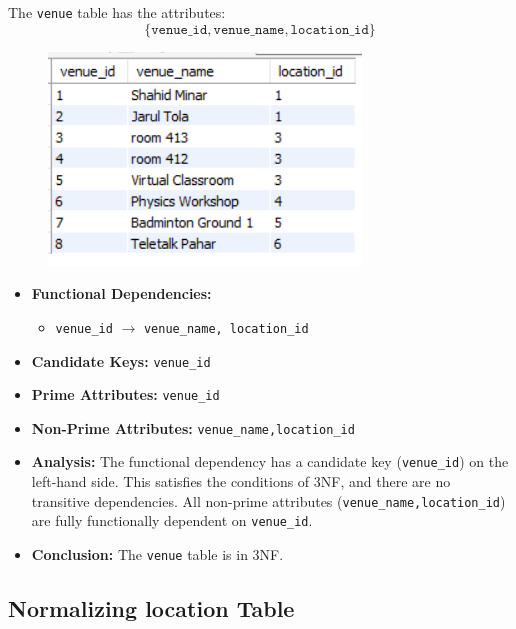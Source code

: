 The \texttt{venue} table has the attributes:
\[
\{ \texttt{venue\_id}, \texttt{venue\_name} , \texttt{location\_id}\}
\]
\begin{figure}
    [h]
    \centering
    \includegraphics{images/table_data/venue_table.png}
\end{figure}
\begin{itemize}
    \item \textbf{Functional Dependencies:}
    \begin{itemize}
        \item \texttt{venue\_id} $\rightarrow$ \texttt{venue\_name, location\_id}
    \end{itemize}

    \item \textbf{Candidate Keys:} \texttt{venue\_id}

    \item \textbf{Prime Attributes:} \texttt{venue\_id}

    \item \textbf{Non-Prime Attributes:} \texttt{venue\_name,location\_id}

    \item \textbf{Analysis:} The functional dependency has a candidate key 
    (\texttt{venue\_id}) on the left-hand side. This satisfies the conditions of 3NF, 
    and there are no transitive dependencies. All non-prime attributes 
    (\texttt{venue\_name,location\_id}) are fully functionally dependent on \texttt{venue\_id}.

    \item \textbf{Conclusion:} The \texttt{venue} table is in 3NF.
\end{itemize}



\subsection{Normalizing location Table}

